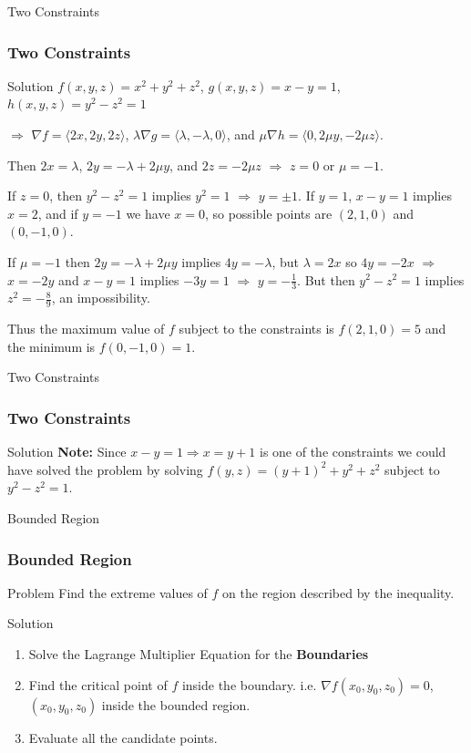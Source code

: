 \documentclass[aspectratio=169, UTF8]{beamer}
\begin{document}
\begin{frame}{Two Constraints}
    \frametitle{Two Constraints}
    \begin{block}{Solution}
        $f(x, y, z) = x^2 + y^2 + z^2$, $g(x, y, z) = x - y = 1$, $h(x, y, z) = y^2 - z^2 = 1$

        \vspace*{1em} $\Rightarrow$ $\nabla f = \langle 2x, 2y, 2z \rangle$, $\lambda \nabla g = \langle \lambda, -\lambda, 0 \rangle$, and $\mu \nabla h = \langle 0, 2\mu y, -2\mu z \rangle$. 

        \vspace*{1em} Then $2x = \lambda$, $2y = -\lambda + 2\mu y$, and $2z = -2\mu z$ $\Rightarrow$ $z = 0$ or $\mu = -1$.

        \vspace*{1em}
        If $z = 0$, then $y^2 - z^2 = 1$ implies $y^2 = 1$ $\Rightarrow$ $y = \pm 1$. If $y = 1$, $x - y = 1$ implies $x = 2$, and if $y = -1$ we have $x = 0$, so possible points are $(2, 1, 0)$ and $(0, -1, 0)$. 
        
        \vspace*{1em}
        If $\mu = -1$ then $2y = -\lambda + 2\mu y$ implies $4y = -\lambda$, but $\lambda = 2x$ so $4y = -2x$ $\Rightarrow$ $x = -2y$ and $x - y = 1$ implies $-3y = 1$ $\Rightarrow$ $y = -\frac{1}{3}$. But then $y^2 - z^2 = 1$ implies $z^2 = -\frac{8}{9}$, an impossibility. 
        
        \vspace*{1em}
        Thus the maximum value of $f$ subject to the constraints is $f(2, 1, 0) = 5$ and the minimum is $f(0, -1, 0) = 1$.

    \end{block}
\end{frame}
\begin{frame}{Two Constraints}
    \frametitle{Two Constraints}
    \begin{block}{Solution}
        \textbf{Note:} Since $x - y = 1 \Rightarrow x = y + 1$ is one of the constraints we could have solved the problem by solving $f(y, z) = (y + 1)^2 + y^2 + z^2$ subject to $y^2 - z^2 = 1$.
    \end{block}
\end{frame}
\begin{frame}{Bounded Region}
    \frametitle{Bounded Region}
    \begin{block}{Problem}
        Find the extreme values of $f$ on the region described by the inequality.
    \end{block}
    \begin{block}{Solution}
        \begin{enumerate}
            \item Solve the Lagrange Multiplier Equation for the \textbf{Boundaries}
            \item Find the critical point of $f$ inside the boundary. i.e. $\nabla f(x_0, y_0, z_0) = 0$, $(x_0,y_0,z_0)$ inside the bounded region.
            \item Evaluate all the candidate points.
        \end{enumerate}
    \end{block}
\end{frame}
\end{document}
